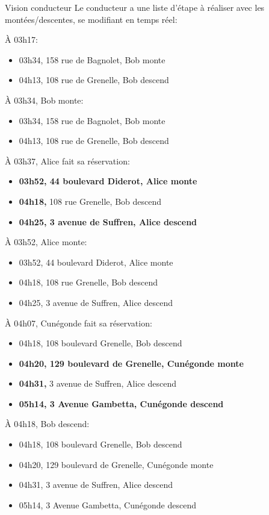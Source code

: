 \documentclass[table]{beamer}
\begin{document}
\begin{frame}[allowframebreaks]{Vision conducteur}
  Le conducteur a une liste d'étape à réaliser avec les
  montées/descentes, se modifiant en temps réel:\framebreak

  À 03h17:
  \begin{itemize}
  \item 03h34, 158 rue de Bagnolet, Bob monte
  \item 04h13, 108 rue de Grenelle, Bob descend
  \end{itemize}\framebreak

  À 03h34, Bob monte:
  \begin{itemize}
  \item<42> 03h34, 158 rue de Bagnolet, Bob monte
  \item 04h13, 108 rue de Grenelle, Bob descend
  \end{itemize}\framebreak

  À 03h37, Alice fait sa réservation:
  \begin{itemize}
  \item \textbf{03h52, 44 boulevard Diderot, Alice monte}
  \item \textbf{04h18,} 108 rue Grenelle, Bob descend
  \item \textbf{04h25, 3 avenue de Suffren, Alice descend}
  \end{itemize}\framebreak

  À 03h52, Alice monte:
  \begin{itemize}
  \item<42> 03h52, 44 boulevard Diderot, Alice monte
  \item 04h18, 108 rue Grenelle, Bob descend
  \item 04h25, 3 avenue de Suffren, Alice descend
  \end{itemize}\framebreak

  À 04h07, Cunégonde fait sa réservation:
  \begin{itemize}
  \item 04h18, 108 boulevard Grenelle, Bob descend
  \item \textbf{04h20, 129 boulevard de Grenelle, Cunégonde monte}
  \item \textbf{04h31,} 3 avenue de Suffren, Alice descend
  \item \textbf{05h14, 3 Avenue Gambetta, Cunégonde descend}
  \end{itemize}\framebreak

  À 04h18, Bob descend:
  \begin{itemize}
  \item<42> 04h18, 108 boulevard Grenelle, Bob descend
  \item 04h20, 129 boulevard de Grenelle, Cunégonde monte
  \item 04h31, 3 avenue de Suffren, Alice descend
  \item 05h14, 3 Avenue Gambetta, Cunégonde descend
  \end{itemize}\framebreak


\end{frame}
\end{document}
